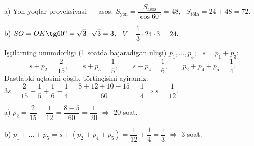 a) Yon yoqlar proyeksiyasi — asos: $S_{\text{yon}}=\dfrac{S_{\text{asos}}}{\cos60^\circ}=48$, \ $S_{\text{töla}}=24+48=72$.

b) $SO=OK\tg60^\circ=\sqrt3\cdot\sqrt3=3$, \ $V=\dfrac13\cdot24\cdot3=24$.

\newpage
{}
Işçilarning unumdorligi (1 soatda bajaradigan uluşi) $p_1,\dots,p_5$; \ $s=p_1+p_3$:
\[s+p_2=\frac2{15},\qquad s+p_5=\frac15,\qquad s+p_4=\frac16,\qquad p_2+p_4+p_5=\frac14.\]
Dastlabki uçtasini qöşib, törtinçisini ayiramiz: \ $3s=\dfrac2{15}+\dfrac15+\dfrac16-\dfrac14=\dfrac{8+12+10-15}{60}=\dfrac14\Rightarrow s=\dfrac1{12}$.

a) $p_2=\dfrac2{15}-\dfrac1{12}=\dfrac{8-5}{60}=\dfrac1{20}$ $\Rightarrow$ 20 soat.

b) $p_1+\dots+p_5=s+(p_2+p_4+p_5)=\dfrac1{12}+\dfrac14=\dfrac13$ $\Rightarrow$ 3 soat.

\ShowJavoblar

